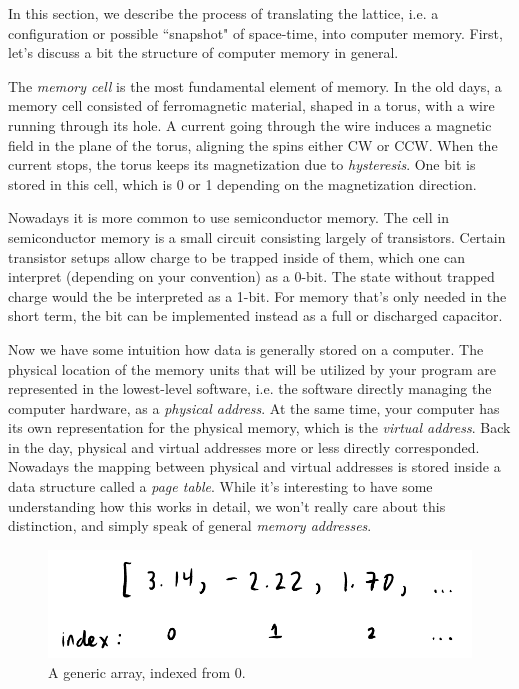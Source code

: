 In this section, we describe the process of translating the lattice, i.e.
a configuration or possible ``snapshot" of space-time, into computer memory.
First, let's discuss a bit the structure of computer memory in general.

The {\it memory cell} is the most fundamental element of memory. In the old
days, a memory cell consisted of ferromagnetic material, shaped in a torus, with
a wire running through its hole. A current going through the wire induces a
magnetic field in the plane of the torus, aligning the spins either CW or CCW.
When the current stops, the torus keeps its magnetization due to 
{\it hysteresis}. One bit is stored in this cell, which is 0
or 1 depending on the magnetization direction.

Nowadays it is more common to use semiconductor memory. The cell in
semiconductor memory is a small circuit consisting largely of transistors.
Certain transistor setups allow charge to be trapped inside of them,
which one can interpret (depending on your convention) as a 0-bit. The state
without trapped charge would the be interpreted as a 1-bit.
For memory that's only needed in the short term, the bit can be implemented 
instead as a full or discharged capacitor.  

Now we have some intuition how data is generally stored on a computer.
The physical location of the memory units that will be utilized by your
program are represented in the lowest-level software, i.e. the software
directly managing the computer hardware, as a {\it physical address}.
At the same time, your computer has its own representation for the physical
memory, which is the {\it virtual address}.
Back in the day, physical and virtual addresses more or less directly corresponded.
Nowadays the mapping between physical and virtual addresses is stored inside a
data structure called a {\it page table}.
While it's interesting to have some understanding how this works in detail,
we won't really care about this distinction, and simply speak of general
{\it memory addresses}. 


\begin{figure}
  \centering
  \includegraphics[width=\linewidth]{figs/array.pdf}
  \caption{A generic array, indexed from 0.} 
  \label{fig:array}
\end{figure}

